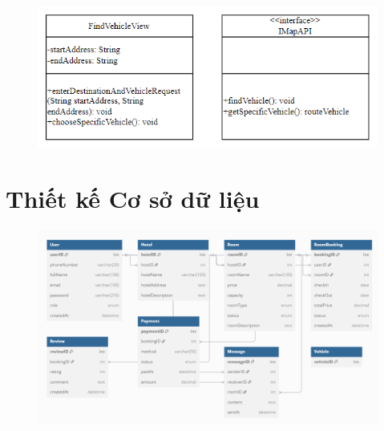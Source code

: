 \begin{figure}[H]
    \centering
    \includegraphics[width=\linewidth]{img3.6/14.png}
\end{figure}

\section{Thiết kế Cơ sở dữ liệu}
\begin{figure}[H]
    \centering
    \includegraphics[width=\linewidth]{img3.7/3.7.png}
\end{figure}

